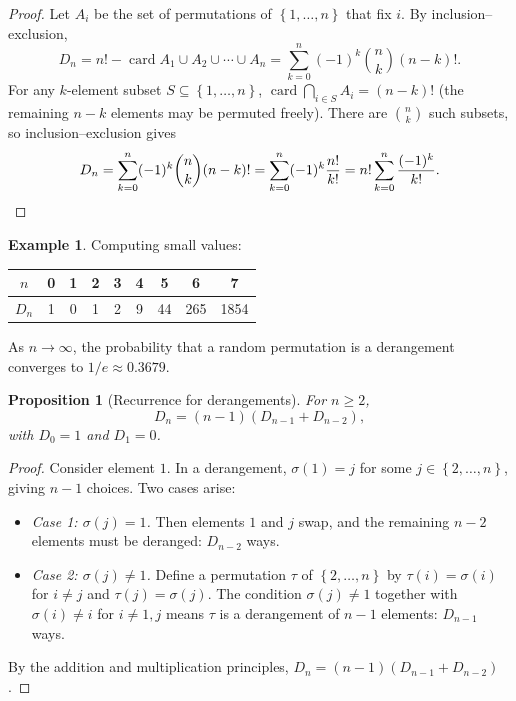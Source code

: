 \documentclass[12pt,a4paper,openany]{book}
\theoremstyle{definition}
\newtheorem{example}[definition]{Example}
\theoremstyle{plain}
\newtheorem{proposition}[definition]{Proposition}
\theoremstyle{remark}
\newcommand{\set}[1]{\left\{#1\right\}}
\DeclareMathOperator{\card}{card}
\begin{document}
\begin{proof}
Let $A_i$ be the set of permutations of $\set{1, \ldots, n}$ that fix $i$.
By inclusion--exclusion,
\[
  D_n = n! - \card{A_1 \cup A_2 \cup \cdots \cup A_n}
      = \sum_{k=0}^{n}(-1)^k \binom{n}{k}(n-k)!.
\]
For any $k$-element subset $S \subseteq \set{1,\ldots,n}$,
$\card{\bigcap_{i \in S} A_i} = (n-k)!$ (the remaining $n-k$ elements may
be permuted freely). There are $\binom{n}{k}$ such subsets, so
inclusion--exclusion gives
\[
  D_n = \sum_{k=0}^{n}(-1)^k \binom{n}{k}(n-k)!
      = \sum_{k=0}^{n}(-1)^k \frac{n!}{k!}
      = n!\sum_{k=0}^{n}\frac{(-1)^k}{k!}.\qedhere
\]
\end{proof}

\begin{example}\label{ex:derangement-small}
Computing small values:
\begin{center}
\begin{tabular}{c|cccccccc}
\toprule
$n$ & 0 & 1 & 2 & 3 & 4 & 5 & 6 & 7 \\ \midrule
$D_n$ & 1 & 0 & 1 & 2 & 9 & 44 & 265 & 1854 \\
\bottomrule
\end{tabular}
\end{center}
As $n \to \infty$, the probability that a random permutation is a derangement
converges to $1/e \approx 0.3679$.
\end{example}

\begin{proposition}[Recurrence for derangements]\label{prop:derangement-recurrence}
For $n \geq 2$,
\[
  D_n = (n-1)(D_{n-1} + D_{n-2}),
\]
with $D_0 = 1$ and $D_1 = 0$.
\end{proposition}

\begin{proof}
Consider element $1$. In a derangement, $\sigma(1) = j$ for some
$j \in \set{2, \ldots, n}$, giving $n - 1$ choices. Two cases arise:
\begin{itemize}[nosep]
  \item \emph{Case 1: $\sigma(j) = 1$.}\; Then elements $1$ and $j$ swap,
    and the remaining $n - 2$ elements must be deranged: $D_{n-2}$ ways.
  \item \emph{Case 2: $\sigma(j) \neq 1$.}\; Define a permutation $\tau$ of
    $\set{2, \ldots, n}$ by $\tau(i) = \sigma(i)$ for $i \neq j$ and
    $\tau(j) = \sigma(j)$. The condition $\sigma(j) \neq 1$ together with
    $\sigma(i) \neq i$ for $i \neq 1,j$ means $\tau$ is a derangement of
    $n - 1$ elements: $D_{n-1}$ ways.
\end{itemize}
By the addition and multiplication principles,
$D_n = (n-1)(D_{n-1} + D_{n-2})$.
\end{proof}
\end{document}
